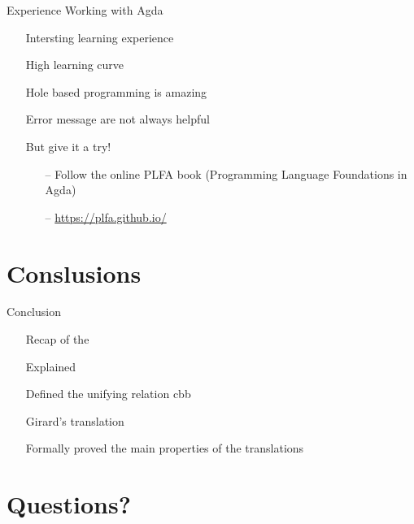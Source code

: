 \documentclass{beamer}
\theoremstyle{definition}
\begin{document}
  \begin{frame}{Experience Working with Agda}
    \begin{itemize}
      \item[\textbullet] Intersting learning experience
      \item[\textbullet] High learning curve
      \item[\textbullet] Hole based programming is amazing
      \item[\textbullet] Error message are not always helpful
      \item[\textbullet] But give it a try! \pause
        \begin{itemize}
          \item[--] Follow the online \alert{PLFA} book (Programming Language Foundations in Agda)
          \item[--] \alert{\url{https://plfa.github.io/}} 
        \end{itemize}  
    \end{itemize}
  \end{frame}

  \section{Conslusions}
  
  \begin{frame}{Conclusion}
    \begin{itemize}
      \item[\textbullet] Recap of the \lc
      \item[\textbullet] Explained \alert{\lab}
      \item[\textbullet] Defined the unifying relation \alert{\textsf{cbb}}
      \item[\textbullet] \alert{Girard's} translation
      \item[\textbullet] Formally proved the main properties of the translations    
    \end{itemize}
  \end{frame}

  \section{Questions?}

\end{document}
